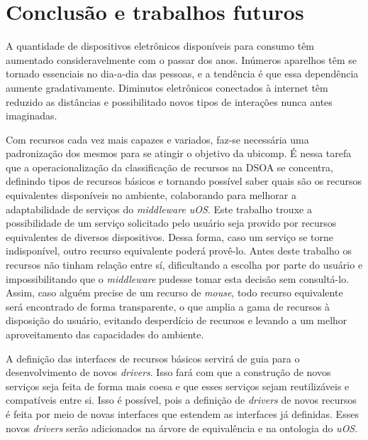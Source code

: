 \chapter{Conclusão e trabalhos futuros}

A quantidade de dispositivos eletrônicos disponíveis para consumo têm aumentado consideravelmente com o passar dos anos. Inúmeros aparelhos têm se tornado essenciais no dia-a-dia das pessoas, e a tendência é que essa dependência aumente gradativamente. Diminutos eletrônicos conectados à internet têm reduzido as distâncias e possibilitado novos tipos de interações nunca antes imaginadas.

\begin{comment}
Atualmente, utilizando um único \emph{smartphone}, é possivel acessar o seu \emph{site} preferido, consultar as ações da bolsa de valores e a previsão do tempo, mudar o canal da sua televisão, ligar a luz do seu quarto, obter rotas urbanas, dentre várias outras tarefas.

É nesse ambiente cada vez mais ubíquo que a classificação de recursos se insere: ambientes com dispositivos heterogêneos (móveis ou não) interagindo entre si, trocando informações ou utilizando capacidades características de cada aparelho.
\end{comment}

Com recursos cada vez mais capazes e variados, faz-se necessária uma padronização dos mesmos para se atingir o objetivo da ubicomp. É nessa tarefa que a operacionalização da classificação de recursos na DSOA se concentra, definindo tipos de recursos básicos e tornando possível saber quais são os recursos equivalentes disponíveis no ambiente, colaborando para melhorar a adaptabilidade de serviços do \emph{middleware uOS}. Este trabalho trouxe a possibilidade de um serviço solicitado pelo usuário seja provido por recursos equivalentes de diversos dispositivos. Dessa forma, caso um serviço se torne indisponível, outro recurso equivalente poderá provê-lo. Antes deste trabalho os recursos não tinham relação entre sí, dificultando a escolha por parte do usuário e impossibilitando que o \emph{middleware} pudesse tomar esta decisão sem consultá-lo. Assim, caso alguém precise de um recurso de \emph{mouse}, todo recurso equivalente será encontrado de forma transparente, o que amplia a gama de recursos à disposição do usuário, evitando desperdício de recursos e levando a um melhor aproveitamento das capacidades do ambiente.

A definição das interfaces de recursos básicos servirá de guia para o desenvolvimento de novos \emph{drivers}. Isso fará com que a construção de novos serviços seja feita de forma mais coesa e que esses serviços sejam reutilizáveis e compatíveis entre si. Isso é possível, pois a definição de \emph{drivers} de novos recursos é feita por meio de novas interfaces que estendem as interfaces já definidas. Esses novos \emph{drivers} serão adicionados na árvore de equivalência e na ontologia do \emph{uOS}.

